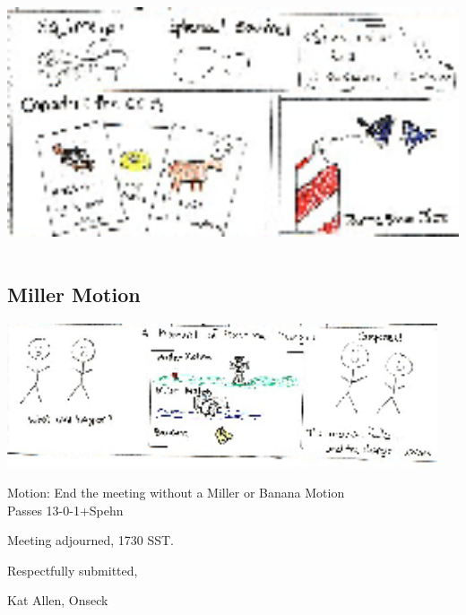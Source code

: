 \documentclass[10pt]{article}
\begin{document}
\includegraphics[height = 3in]{panel.2004-03-12.11.eps}

\subsection*{Miller Motion}
\includegraphics[width = 5in]{panel.2004-03-12.12.eps}


Motion: End the meeting without a Miller or Banana Motion\\
Passes 13-0-1+Spehn

\noindent
Meeting adjourned, 1730 SST.

\vspace{18pt}

\centerline{Respectfully submitted,}
\centerline{Kat Allen,  Onseck}
\end{document}
